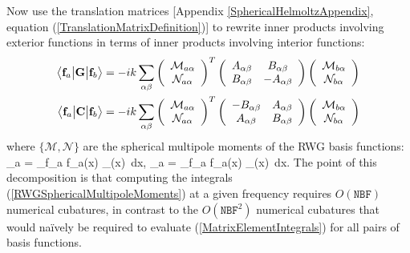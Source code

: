 \documentclass[dvips,letterpaper]{article}
\begin{document}
Now use the translation matrices 
[Appendix \ref{SphericalHelmoltzAppendix}, 
 equation (\ref{TranslationMatrixDefinition})]
to rewrite inner products involving exterior functions in terms
of inner products involving interior functions:
\begin{subequations}
\begin{align}
 \big\langle \mathbf{f}_a \big| \mathbf{G} \big| \mathbf{f}_b \big\rangle
&=-ik\sum_{\alpha\beta} 
   \left(\begin{array}{c}
     \mathcal{M}_{a\alpha}  \\ \mathcal{N}_{a\alpha}
   \end{array}\right)^T
   \left(\begin{array}{cc}
   A_{\alpha\beta} & B_{\alpha\beta} \\
   B_{\alpha\beta} & -A_{\alpha\beta}
   \end{array}\right)
   \left(\begin{array}{c}
     \mathcal{M}_{b\alpha}  \\ \mathcal{N}_{b\alpha}
   \end{array}\right)
\\
 \big\langle \mathbf{f}_a \big| \mathbf{C} \big| \mathbf{f}_b \big\rangle
&=-ik\sum_{\alpha\beta} 
   \left(\begin{array}{c}
     \mathcal{M}_{a\alpha}  \\ \mathcal{N}_{a\alpha}
   \end{array}\right)^T
   \left(\begin{array}{cc}
  -B_{\alpha\beta} & A_{\alpha\beta} \\
   A_{\alpha\beta} & B_{\alpha\beta}
   \end{array}\right)
   \left(\begin{array}{c}
     \mathcal{M}_{b\alpha}  \\ \mathcal{N}_{b\alpha}
   \end{array}\right)
\end{align}
\label{SphericalMultipoleMatrixElements}
\end{subequations}
where $\{ \mathcal{M}, \mathcal{N}\}$ are the spherical multipole moments
of the RWG basis functions:
{
   _{a\alpha}
   =
   \int_{\sup \vb f_a} \vb f_a(\vb x) \cdot \MInt_\alpha(\vb x)\, d\vb x,
   \qquad
   _{a\alpha}
   =
   \int_{\sup \vb f_a} \vb f_a(\vb x) \cdot \NInt_\alpha(\vb x)\, d\vb x.
}
The point of this decomposition is that computing the integrals
(\ref{RWGSphericalMultipoleMoments}) at a given frequency
requires $O(\texttt{NBF})$ numerical cubatures, in contrast to 
the $O(\texttt{NBF}^2)$ numerical cubatures that would na\"ively 
be required to evaluate (\ref{MatrixElementIntegrals}) for 
all pairs of basis functions.
\end{document}
